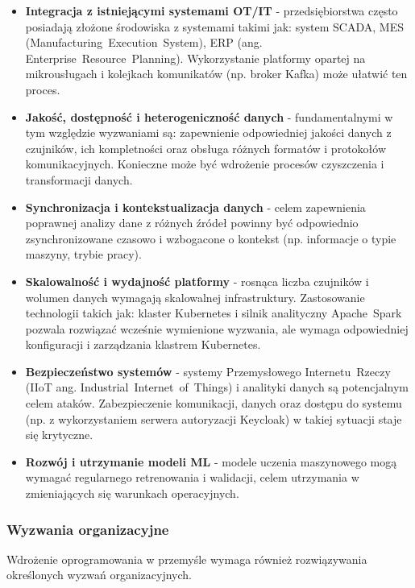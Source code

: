 \begin{itemize}
    \item \textbf{Integracja z istniejącymi systemami OT/IT} - przedsiębiorstwa często posiadają złożone środowiska z systemami takimi jak: system SCADA, MES (\mbox{Manufacturing Execution System}), ERP (ang. \mbox{Enterprise Resource Planning}). Wykorzystanie platformy opartej na mikrousługach i kolejkach komunikatów (np. broker Kafka) może ułatwić ten proces.
    \item \textbf{Jakość, dostępność i heterogeniczność danych} - fundamentalnymi w tym względzie wyzwaniami są:  zapewnienie odpowiedniej jakości danych z czujników, ich kompletności oraz obsługa różnych formatów i protokołów komunikacyjnych. Konieczne może być wdrożenie procesów czyszczenia i transformacji danych.
    \item \textbf{Synchronizacja i kontekstualizacja danych} - celem zapewnienia poprawnej analizy dane z różnych źródeł powinny być odpowiednio zsynchronizowane czasowo i wzbogacone o kontekst (np. informacje o typie maszyny, trybie pracy).
    \item \textbf{Skalowalność i wydajność platformy} - rosnąca liczba czujników i wolumen danych wymagają skalowalnej infrastruktury. Zastosowanie technologii takich jak: klaster Kubernetes i silnik analityczny \mbox{Apache Spark} pozwala rozwiązać wcześnie wymienione wyzwania, ale wymaga odpowiedniej konfiguracji i zarządzania klastrem Kubernetes.
    \item \textbf{Bezpieczeństwo systemów} - systemy Przemysłowego \mbox{Internetu Rzeczy} \\ (\mbox{IIoT} ang. \mbox{Industrial Internet of Things}) i analityki danych są potencjalnym celem ataków. Zabezpieczenie komunikacji, danych oraz dostępu do systemu (np. z wykorzystaniem serwera autoryzacji Keycloak) w takiej sytuacji staje się krytyczne.
    \item \textbf{Rozwój i utrzymanie modeli ML} - modele uczenia maszynowego mogą wymagać regularnego retrenowania i walidacji, celem utrzymania w zmieniających się warunkach operacyjnych.
\end{itemize}

\subsubsection{Wyzwania organizacyjne}
\label{subsubsec:wyzwania_organizacyjne}

Wdrożenie oprogramowania w przemyśle wymaga również rozwiązywania określonych wyzwań organizacyjnych.


